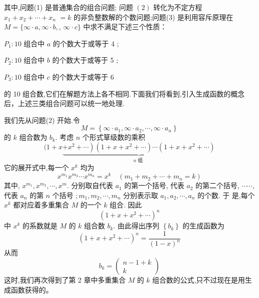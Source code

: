 \documentclass{report}
\begin{document}
其中,问题(1) 是普通集合的组合问题; 问题 $(2)$ 转化为不定方程 $x_{1}+x_{2}+\cdots+x_{n}$ $=k$ 的非负整数解的个数问题;问题(3) 是利用容斥原理在 $M=\{\infty \cdot a, \infty \cdot b,$, $\infty \cdot c\}$ 中求不满足下述三个性质：

$P_{1}: 10$ 组合中 $a$ 的个数大于或等于 4 ;

$P_{2}: 10$ 组合中 $b$ 的个数大于或等于 5 ;

$P_{3}: 10$ 组合中 $c$ 的个数大于或等于 6

的 10 组合数,它们在解题方法上各不相同.下面我们将看到,引入生成函数的概念 后，上述三类组合问题可以统一地处理.

我们先从问题(2) 开始.令
$$
M=\left\{\infty \cdot a_{1}, \infty \cdot a_{2}, \cdots, \infty \cdot a_{n}\right\}
$$
的 $k$ 组合数为 $b_{k}$. 考虑 $n$ 个形式筸级数的乘积
$$
(1+x \underbrace{\left.+x^{2}+\cdots\right)\left(1+x+x^{2}+\cdots\right) \cdots\left(1+x+x^{2}+\cdots\right)}_{n \text { 组 }}
$$
它的展开式中,每一个 $x^{k}$ 均为
$$
x^{m_{1}} x^{m_{2}} \cdots x^{m_{n}}=x^{k} \quad\left(m_{1}+m_{2}+\cdots+m_{n}=k\right)
$$
其中, $x^{m_{1}}, x^{m_{2}}, \cdots, x^{m}$. 分别取自代表 $a_{1}$ 的第一个括号, 代表 $a_{2}$ 的第二个括号, $\cdots \cdots$, 代表 $a_{n}$ 的第 $n$ 个括号 $; m_{1}, m_{2}, \cdots, m_{n}$ 分别表示取 $a_{1}, a_{2}, \cdots, a_{n}$ 的个数. 于 是,每个 $x^{k}$ 都对应着多重集合 $M$ 的一个 $k$ 组合. 因此
$$
\left(1+x+x^{2}+\cdots\right)^{n}
$$
中 $x^{k}$ 的系数就是 $M$ 的 $k$ 组合数 $b_{k}$. 由此得出序列 $\left\{b_{k}\right\}$ 的生成函数为
$$
\left(1+x+x^{2}+\cdots\right)^{n}=\frac{1}{(1-x)^{n}}
$$
从而
$$
b_{k}=\left(\begin{array}{c}
n-1+k \\
k
\end{array}\right)
$$
这时,我们再次得到了第 2 章中多重集合 $M$ 的 $k$ 组合数的公式,只不过现在是用生成函数获得的。
\end{document}
